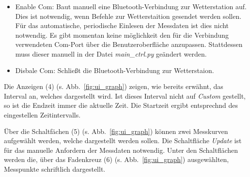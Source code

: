 \begin{itemize}
\begin{itemize}
  \item Enable Com: Baut manuell eine Bluetooth-Verbindung zur Wetterstation auf. Dies ist notwendig, wenn Befehle zur Wetterstaition gesendet werden sollen. Für das automatische, periodische Einlesen der Messdaten ist dies nicht notwendig. Es gibt momentan keine möglichkeit den für die Verbindung verwendeten Com-Port über die Benutzeroberfläche anzupassen. Stattdessen muss dieser manuell in der Datei \emph{main\_ctrl.py} geändert werden.
  \item Disbale Com: Schließt die Bluetooth-Verbindung zur Wetterstaion.
  \end{itemize}
\end{itemize}

Die Anzeigen (4) (s. Abb.~\ref{fig:ui_graph}) zeigen, wie bereits erwähnt, das Interval an, welches dargestellt wird. Ist dieses Interval nicht auf \emph{Custom} gestellt, so ist die Endzeit immer die aktuelle Zeit. Die Startzeit ergibt entsprechnd des eingestellen Zeitintervalls.

Über die Schaltfächen (5) (s. Abb.~\ref{fig:ui_graph}) können zwei Messkurven aufgewählt werden, welche dargestellt werden sollen. Die Schaltfläche \emph{Update} ist für das manuelle Anfordern der Messdaten notwendig. Unter den Schaltflächen werden die, über das Fadenkreuz (6) (s. Abb.~\ref{fig:ui_graph}) ausgewählten, Messpunkte schriftlich dargestellt.

